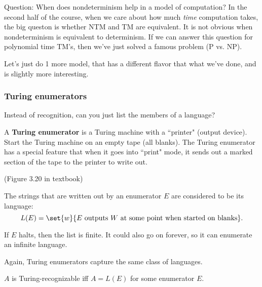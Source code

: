 
Question: When does nondeterminism help in a model of computation? In the second half of the course, when we care about how much {\it time} computation takes, the big queston is whether NTM and TM are equivalent. It is not obvious when nondeterminism is equivalent to determinism. 
If we can answer this question for polynomial time TM's, then we've just solved a famous problem (P vs. NP).


Let's just do 1 more model, that has a different flavor that what we've done, and is slightly more interesting.
\subsubsection{Turing enumerators}
Instead of recognition, can you just list the members of a language?

\begin{df}
A \textbf{Turing enumerator} is a Turing machine with a ``printer" (output device). Start the Turing machine on an empty tape (all blanks). The Turing enumerator has a special feature that when it goes into ``print" mode, it sends out a marked section of the tape to the printer to write out. %


(Figure 3.20 in textbook)

The strings that are written out by an enumerator $E$ are considered to be its language:
\[
L(E)=\set{w}{E\text{ outputs }W\text{ at some point when started on blanks}}.
\]
\end{df}
If $E$ halts, then the list is finite. It could also go on forever, so it can enumerate an infinite language.

Again, Turing enumerators capture the same class of languages.
\begin{thm}
$A$ is Turing-recognizable iff $A=L(E)$ for some enumerator $E$.
\end{thm}

